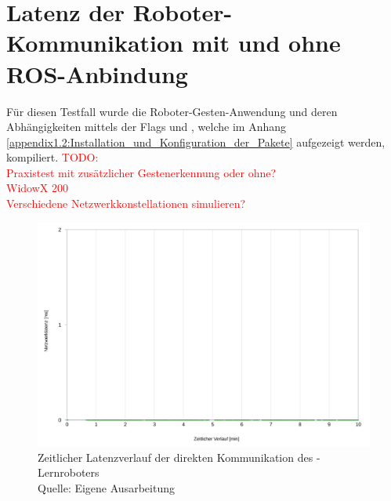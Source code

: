 \section{Latenz der Roboter-Kommunikation mit und ohne ROS-Anbindung}
Für diesen Testfall wurde die Roboter-Gesten-Anwendung und deren Abhängigkeiten mittels der Flags  und , welche im Anhang \ref{appendix1.2:Installation_und_Konfiguration_der_Pakete} aufgezeigt werden, kompiliert.
\textcolor{red}{TODO:\\
Praxistest mit zusätzlicher Gestenerkennung oder ohne?\\
WidowX 200\\
Verschiedene Netzwerkkonstellationen simulieren? %
}

\begin{figure}[htb]
	\centering
	\includegraphics[width=1.04\textwidth]{images/ergebnisse/Messung_der_direkten_Kommunikation}
	\caption[Zeitlicher Latenzverlauf der direkten Kommunikation des -Lernroboters]{Zeitlicher Latenzverlauf der direkten Kommunikation des -Lernroboters\\Quelle: Eigene Ausarbeitung}
	\label{fig:measurement_robot_direct_communication}
\end{figure}
\FloatBarrier

